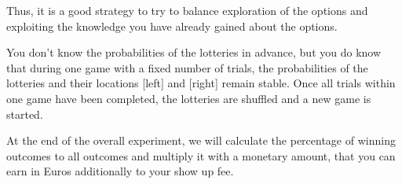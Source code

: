 \documentclass[12pt, oneside]{scrartcl}
\begin{document}
Thus, it is a good strategy to try to balance exploration of the options and exploiting the knowledge you have already gained about the options. \vspace{\baselineskip}

You don’t know the probabilities of the lotteries in advance, but you do know that during one game with a fixed number of trials, the probabilities of the lotteries and their locations [left] and [right] remain stable. Once all trials within one game have been completed, the lotteries are shuffled and a new game is started.

At the end of the overall experiment, we will calculate the percentage of winning outcomes to all outcomes and multiply it with a monetary amount, that you can earn in Euros additionally to your show up fee.


\pagebreak
\end{document}
